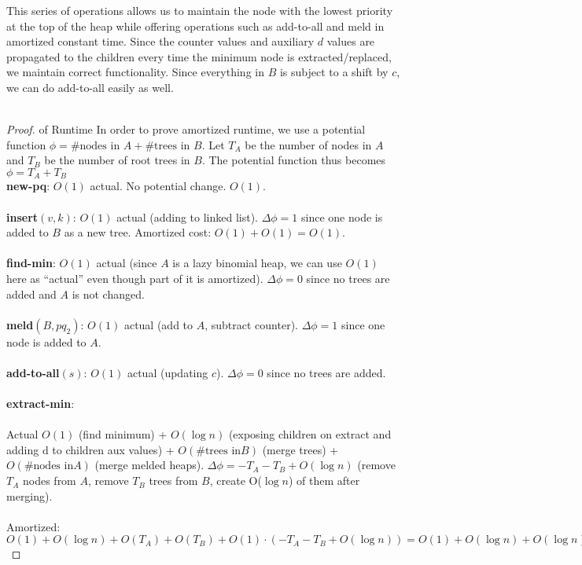 \documentclass{article}
\theoremstyle{casestyle}
\begin{document}
This series of operations allows us to maintain the node with the lowest priority at the top of the heap while offering operations such as add-to-all and meld in amortized constant time. Since the counter values and auxiliary $d$ values are propagated to the children every time the minimum node is extracted/replaced, we maintain correct functionality. Since everything in $B$ is subject to a shift by $c$, we can do add-to-all easily as well. \\\\

\begin{proof} of Runtime
In order to prove amortized runtime, we use a potential function $\phi=\text{\# nodes in } A + \text{\# trees in } B$. Let $T_A$ be the number of nodes in $A$ and $T_B$ be the number of root trees in $B$. The potential function thus becomes $\phi=T_A+T_B$  \\
\textbf{new-pq}: $O(1)$ actual. No potential change. $O(1)$.\\\\
\textbf{insert}$(v,k)$: $O(1)$ actual (adding to linked list). $\Delta \phi = 1$ since one node is added to $B$ as a new tree. Amortized cost: $O(1) + O(1) = O(1)$.\\\\
\textbf{find-min}: $O(1)$ actual (since $A$ is a lazy binomial heap, we can use $O(1)$ here as ``actual'' even though part of it is amortized). $\Delta \phi = 0$ since no trees are added and $A$ is not changed.\\\\
\textbf{meld}$(B,pq_2)$: $O(1)$ actual (add to $A$, subtract counter). $\Delta \phi = 1$ since one node is added to $A$. \\\\
\textbf{add-to-all}$(s)$: $O(1)$ actual (updating $c$). $\Delta \phi = 0$ since no trees are added.\\\\
\textbf{extract-min}: \\\\ Actual $O(1)$ (find minimum) + $O(\log n)$ (exposing children on extract and adding d to children aux values) + $O(\text{\# trees in} B)$ (merge trees) + $O(\text{\# nodes in} A)$ (merge melded heaps). $\Delta \phi = -T_A-T_B + O(\log n)$ (remove $T_A$ nodes from $A$, remove $T_B$ trees from $B$, create O($\log n$) of them after merging). \\\\ Amortized: $O(1) + O(\log n) + O(T_A) + O(T_B) + O(1) \cdot (-T_A - T_B + O(\log n)) = O(1) + O(\log n) + O(\log n) = O(\log n)$
\end{proof}
\end{document}
